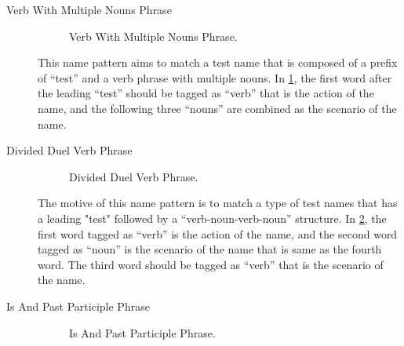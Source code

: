 \begin{description}

\item[Verb With Multiple Nouns Phrase]

\begin{figure}[htbp]
\centering
    \begin{subfigure}{0.65\textwidth}
    \end{subfigure}
\caption{Verb With Multiple Nouns Phrase.}
\label{fig:name_vmn}
\end{figure}

This name pattern aims to match a test name that is composed of a prefix of \enquote{test} and a verb phrase with multiple nouns.
%
In \cref{fig:name_vmn}, the first word after the leading \enquote{test} should be tagged as \enquote{verb} that is the action of the name, and the following three \enquote{nouns} are combined as the scenario of the name.

\item[Divided Duel Verb Phrase]

\begin{figure}[H]
\centering
    \begin{subfigure}{0.65\textwidth}
    \end{subfigure}
\caption{Divided Duel Verb Phrase.}
\label{fig:divided-dual-verb}
\end{figure}


The motive of this name pattern is to match a type of test names that has a leading "test" followed by a \enquote{verb-noun-verb-noun} structure.
%
In \cref{fig:divided-dual-verb}, the first word tagged as \enquote{verb} is the action of the name, and the second word tagged as \enquote{noun} is the scenario of the name that is same as the fourth word.
%
The third word should be tagged as \enquote{verb} that is the scenario of the name.

\item[Is And Past Participle Phrase]

\begin{figure}[H]
\centering
    \begin{subfigure}{0.65\textwidth}
    \end{subfigure}
\caption{Is And Past Participle Phrase.}
\label{fig:IsAndPast}
\end{figure}


\end{description}
